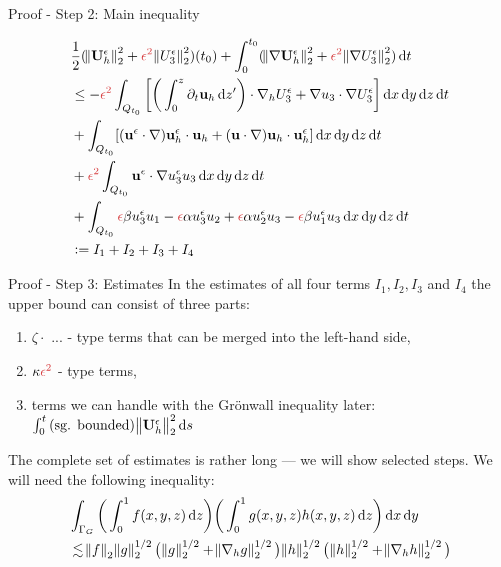 \documentclass{beamer}
\newcommand*\diff{\mathop{}\!\mathrm{d}}
\begin{document}
\begin{frame}{Proof - Step 2: Main inequality}

  \begin{equation} \nonumber
    \begin{split}
      & \frac{1}{2} (\norm{\mathbf{U}_h^\epsilon}_2^2 + \textcolor{jasper}{\epsilon^2} \norm{U_3^\epsilon}_2^2) (t_0) + \int_0^{t_0} (\norm{\nabla \mathbf{U}_h^\epsilon}_2^2 + \textcolor{jasper}{\epsilon^2} \norm{\nabla U_3^\epsilon}_2^2) \diff t  \\
      & \leq - \textcolor{jasper}{\epsilon^2} \int_{Q_{t_0}} \bigg [ \bigg ( \int_0^z \partial_t \mathbf{u}_h \diff z' \bigg ) \cdot \nabla_h U_3^\epsilon + \nabla u_3 \cdot \nabla U_3^\epsilon \bigg ] \diff x \diff y \diff z \diff t \\
      & + \int_{Q_{t_0}} [(\mathbf{u}^\epsilon \cdot \nabla) \mathbf{u}_h^\epsilon \cdot \mathbf{u}_h + (\mathbf{u} \cdot \nabla )\mathbf{u}_h \cdot \mathbf{u}_h^\epsilon] \diff x \diff y \diff z \diff t \\
      & + \textcolor{jasper}{\epsilon^2} \int_{Q_{t_0}} \mathbf{u}^\epsilon \cdot \nabla u_3^\epsilon u_3 \diff x \diff y \diff z \diff t \\
      & + \int_{Q_{t_0}}  \textcolor{jasper}{\epsilon} \beta u_3^\epsilon u_1 - \textcolor{jasper}{\epsilon} \alpha u_3^\epsilon u_2 + \textcolor{jasper}{\epsilon} \alpha u_2^\epsilon u_3 - \textcolor{jasper}{\epsilon} \beta u_1^\epsilon u_3 \diff x \diff y \diff z \diff t \\
      & := I_1 + I_2 + I_3 + I_4
    \end{split}
  \end{equation}

\end{frame}

\begin{frame}{Proof - Step 3: Estimates}
In the estimates of all four terms $I_1, I_2, I_3$ and $I_4$ the upper bound can consist of three parts:
\begin{enumerate}
\item $\zeta \cdot$ ... - type terms that can be merged into the left-hand side,
\item $\kappa \textcolor{jasper}{\epsilon^2}$ - type terms,
\item terms we can handle with the Gr\"onwall inequality later: $\int_0^{t} \text{(sg. bounded)} \norm{\mathbf{U}_h^\epsilon}_2^2 \diff s$
\end{enumerate}

The complete set of estimates is rather long --- we will show selected steps. We will need the following inequality:
\begin{equation}\nonumber
    \begin{split}
      & \int_{\Gamma_G} \bigg ( \int_0^1 f(x,y,z) \diff z \bigg) \bigg ( \int_0^1 g(x,y,z) h(x,y,z) \diff z \bigg ) \diff x \diff y \\
      & \lesssim \norm{f}_2 \norm{g}_2^{1/2} \big ( \norm{g}_2^{1/2} + \norm{\nabla_h g}_2^{1/2} \big ) \norm{h}_2^{1/2} \big (\norm{h}_2^{1/2} + \norm{\nabla_h h}_2^{1/2} \big )
    \end{split}
\end{equation}
\end{frame}
\end{document}
